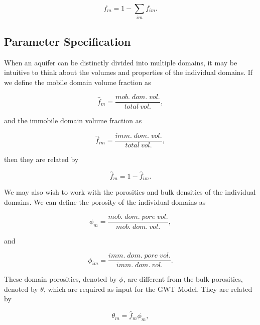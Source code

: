 \begin{equation}
\label{eqn:fm2}
f_m = 1 - \sum_{im}f_{im}.
\end{equation}

\subsection{Parameter Specification} \label{sec:solidmassfrac3}

When an aquifer can be distinctly divided into multiple domains, it may be intuitive to think about the volumes and properties of the individual domains.  If we define the mobile domain volume fraction as

\begin{equation}
\label{eqn:fm3}
\hat{f}_m = \frac{mob. \; dom. \; vol.}{total \: vol.},
\end{equation}

\noindent and the immobile domain volume fraction as

\begin{equation}
\label{eqn:fm4}
\hat{f}_{im} = \frac{imm. \; dom. \; vol.}{total \: vol.},
\end{equation}

\noindent then they are related by

\begin{equation}
\label{eqn:fm5}
\hat{f}_m = 1 - \hat{f}_{im}.
\end{equation}

We may also wish to work with the porosities and bulk densities of the individual domains.  We can define the porosity of the individual domains as

\begin{equation}
\label{eqn:phi_m}
\phi_m = \frac{mob. \; dom. \; pore \; vol.}{mob. \; dom. \: vol.},
\end{equation}

\noindent and

\begin{equation}
\label{eqn:phi_im}
\phi_{im} = \frac{imm. \; dom. \; pore \; vol.}{imm. \; dom. \: vol.}.
\end{equation}

\noindent These domain porosities, denoted by $\phi$, are different from the bulk porosities, denoted by $\theta$, which are required as input for the GWT Model.  They are related by 

\begin{equation}
\label{eqn:theta1}
\theta_{m} = \hat{f}_{m} \phi_{m},
\end{equation}

